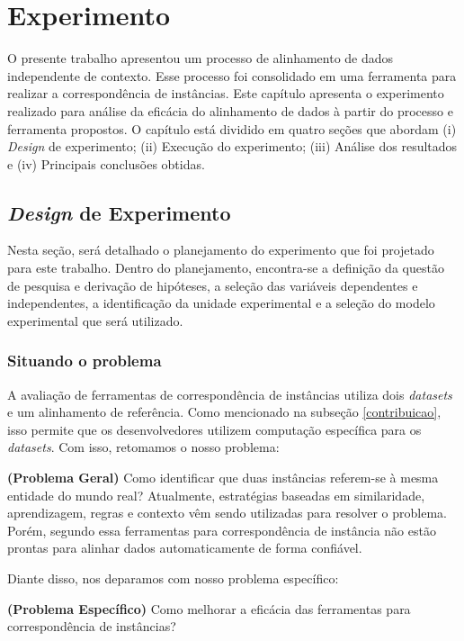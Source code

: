 \chapter{Experimento}
\label{cap:experimento}
O presente trabalho apresentou um processo de alinhamento de dados independente de contexto. Esse processo foi consolidado em uma ferramenta para realizar a correspondência de instâncias. Este capítulo apresenta o experimento realizado para análise da eficácia do alinhamento de dados à partir do processo e ferramenta propostos. O capítulo está dividido em quatro seções que abordam (i) \textit{Design} de experimento; (ii) Execução do experimento; (iii) Análise dos resultados e (iv) Principais conclusões obtidas.

\section{\textit{Design} de Experimento}
Nesta seção, será detalhado o planejamento do experimento que foi projetado para este trabalho. Dentro do planejamento, encontra-se a definição da questão de pesquisa e derivação de hipóteses, a seleção das variáveis dependentes e independentes, a identificação da unidade experimental e a seleção do modelo experimental que será utilizado.

\subsection{Situando o problema}
A avaliação de ferramentas de correspondência de instâncias utiliza dois \textit{datasets} e um alinhamento de referência. Como mencionado na subseção \ref{contribuicao}, isso permite que os desenvolvedores utilizem computação específica para os \textit{datasets}. Com isso, retomamos o nosso problema:

\textbf{(Problema Geral)} Como identificar que duas instâncias referem-se à mesma entidade do mundo real?
Atualmente, estratégias baseadas em similaridade, aprendizagem, regras e contexto \cite{castano2011ontology} vêm sendo utilizadas para resolver o problema. Porém, segundo  essa ferramentas para correspondência de instância não estão prontas para alinhar dados automaticamente de forma confiável. 

Diante disso, nos deparamos com nosso problema específico: 

\textbf{(Problema Específico)} Como melhorar a eficácia das ferramentas para correspondência de instâncias?


